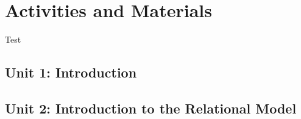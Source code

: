 \section{Activities and Materials}

Test

\subsection{Unit 1: Introduction}





\subsection{Unit 2: Introduction to the Relational Model}
